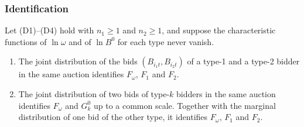 \subsubsection{Identification}

\begin{theorem}\label{thm:15-krasno}
Let (D1)--(D4) hold with $n_1\ge1$ and $n_2\ge1$, and suppose the characteristic functions of $\ln\omega$ and
of $\ln B^0$ for each type never vanish.
\begin{enumerate}[label=(\roman*)]
\item The joint distribution of the bids $(B_{i_1t},B_{i_2t})$ of a type-1 and a type-2 bidder in the same
auction identifies $F_\omega$, $F_1$ and $F_2$.
\item The joint distribution of two bids of type-$k$ bidders in the same auction identifies $F_\omega$ and
$G^0_k$ up to a common scale. Together with the marginal distribution of one bid of the other type, it
identifies $F_\omega$, $F_1$ and $F_2$.
\end{enumerate}
\end{theorem}

